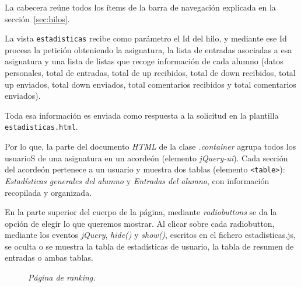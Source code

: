 \documentclass[a4paper, 12pt]{book}
\begin{document}
La cabecera re\'une todos los \'items de la barra de navegaci\'on explicada en la secci\'on~\ref{sec:hilos}. 

La vista \texttt{estadisticas} recibe como par\'ametro el Id del hilo, y mediante ese Id procesa la petici\'on obteniendo la asignatura, la lista 
de entradas asociadas a esa asignatura y una lista de listas que recoge informaci\'on de cada alumno (datos personales, total de entradas, total de up 
recibidos, total de down recibidos, total up enviados, total down enviados, total comentarios recibidos y total comentarios enviados).

Toda esa informaci\'on es enviada como respuesta a la solicitud en la plantilla \texttt{estadisticas.html}. 

Por lo que, la parte del documento \textit{HTML} de la clase \textit{.container} agrupa todos los usuarioS de una asignatura en un acorde\'on (elemento 
\textit{jQuery-ui}). Cada secci\'on del acorde\'on pertenece a un usuario y muestra dos tablas (elemento \texttt{<table>}): \textit{Estad\'isticas 
generales del alumno} y \textit{Entradas del alumno}, con informaci\'on recopilada y organizada. 

En la parte superior del cuerpo de la p\'agina, mediante \textit{radiobuttons} se da la opci\'on de elegir lo que queremos mostrar. Al clicar sobre cada 
radiobutton, mediante los eventos \textit{jQuery}, \textit{hide()} y \textit{show()}, 
escritos en el fichero estadisticas.js, se oculta o se muestra la tabla de estad\'isticas de usuario, la tabla de resumen de entradas o ambas tablas.

\begin{figure}
  \centering
  \caption{\textit{P\'agina de ranking.}}
  \label{fig:estadisticas}
\end{figure}
\end{document}
